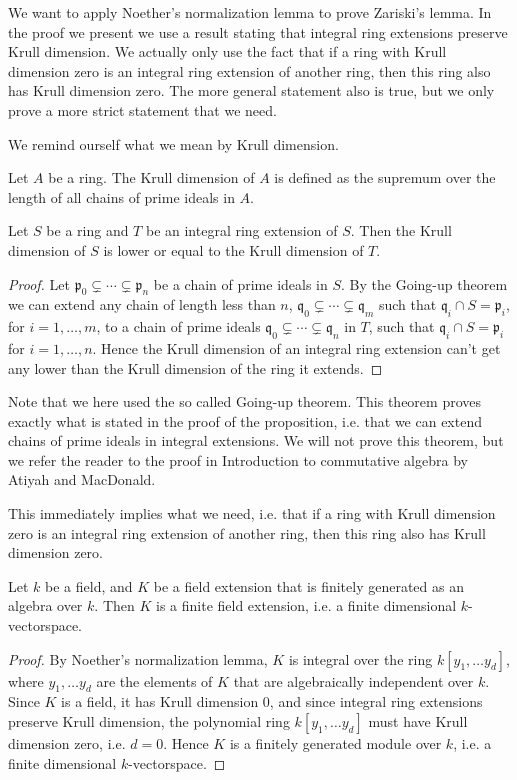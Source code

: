 We want to apply Noether's normalization lemma to prove Zariski's lemma. 
In the proof we present we use a result stating that integral ring extensions preserve Krull dimension. 
We actually only use the fact that if a ring with Krull dimension zero is an integral ring extension of another ring, 
then this ring also has Krull dimension zero. 
The more general statement also is true, 
but we only prove a more strict statement that we need. 

We remind ourself what we mean by Krull dimension.
\begin{definition}
Let $A$ be a ring. 
The Krull dimension of $A$ is defined as the supremum over the length of all chains of prime ideals in $A$.
\end{definition}

\begin{proposition}
Let $S$ be a ring and $T$ be an integral ring extension of $S$. 
Then the Krull dimension of $S$ is lower or equal to the Krull dimension of $T$. 
\end{proposition}
\begin{proof}
Let $\mathfrak{p}_0\subsetneq \cdots \subsetneq \mathfrak{p}_n$ be a chain of prime ideals in $S$. 
By the Going-up theorem we can extend any chain of length less than $n$, 
$\mathfrak{q}_0\subsetneq \cdots \subsetneq \mathfrak{q}_m$ such that $\mathfrak{q}_i\cap S = \mathfrak{p}_i$, 
for $i=1,\ldots, m$, 
to a chain of prime ideals $\mathfrak{q}_0\subsetneq \cdots \subsetneq \mathfrak{q}_n$ in $T$, 
such that $\mathfrak{q}_i\cap S = \mathfrak{p}_i$ for $i=1,\ldots, n$. 
Hence the Krull dimension of an integral ring extension can't get any lower than the Krull dimension of the ring it extends. 
\end{proof}

Note that we here used the so called Going-up theorem. 
This theorem proves exactly what is stated in the proof of the proposition, 
i.e. that we can extend chains of prime ideals in integral extensions. 
We will not prove this theorem, 
but we refer the reader to the proof in Introduction to commutative algebra by Atiyah and MacDonald. 

This immediately implies what we need, 
i.e. that if a ring with Krull dimension zero is an integral ring extension of another ring, 
then this ring also has Krull dimension zero. 

\begin{corollary}
Let $k$ be a field, and $K$ be a field extension that is finitely generated as an algebra over $k$. 
Then $K$ is a finite field extension, 
i.e. a finite dimensional $k$-vectorspace. 
\end{corollary}
\begin{proof}
By Noether's normalization lemma, 
$K$ is integral over the ring $k[y_1, \ldots y_d]$, 
where $y_1, \ldots y_d$ are the elements of $K$ that are algebraically independent over $k$. 
Since $K$ is a field, it has Krull dimension $0$, 
and since integral ring extensions preserve Krull dimension, 
the polynomial ring $k[y_1, \ldots y_d]$ must have Krull dimension zero, 
i.e. $d=0$. Hence $K$ is a finitely generated module over $k$, 
i.e. a finite dimensional $k$-vectorspace. 
\end{proof}

